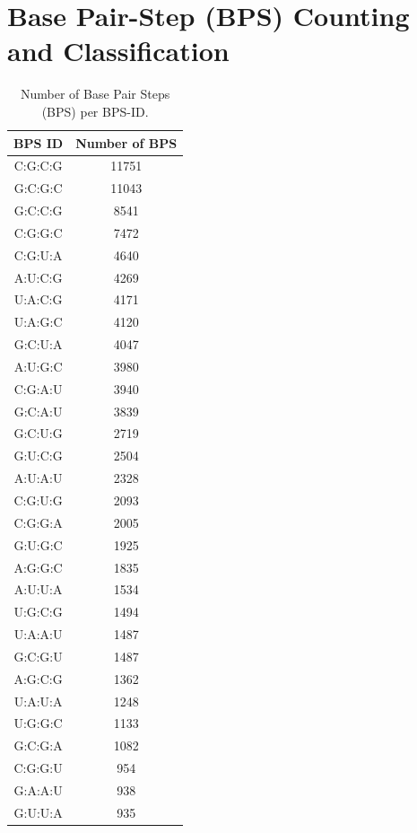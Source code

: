 




\section{Base Pair-Step (BPS) Counting and Classification}


\begin{center}
\begin{longtable}{c|c}
\caption{Number of Base Pair Steps (BPS) per BPS-ID.}\\ \hline
\bf{BPS ID} & \bf{Number of BPS}\\ \hline \hline
C:G:C:G & 11751 \\ \hline
G:C:G:C & 11043 \\ \hline
G:C:C:G & 8541 \\ \hline
C:G:G:C & 7472 \\ \hline
C:G:U:A & 4640 \\ \hline
A:U:C:G & 4269 \\ \hline
U:A:C:G & 4171 \\ \hline
U:A:G:C & 4120 \\ \hline
G:C:U:A & 4047 \\ \hline
A:U:G:C & 3980 \\ \hline
C:G:A:U & 3940 \\ \hline
G:C:A:U & 3839 \\ \hline
G:C:U:G & 2719 \\ \hline
G:U:C:G & 2504 \\ \hline
A:U:A:U & 2328 \\ \hline
C:G:U:G & 2093 \\ \hline
C:G:G:A & 2005 \\ \hline
G:U:G:C & 1925 \\ \hline
A:G:G:C & 1835 \\ \hline
A:U:U:A & 1534 \\ \hline
U:G:C:G & 1494 \\ \hline
U:A:A:U & 1487 \\ \hline
G:C:G:U & 1487 \\ \hline
A:G:C:G & 1362 \\ \hline
U:A:U:A & 1248 \\ \hline
U:G:G:C & 1133 \\ \hline
G:C:G:A & 1082 \\ \hline
C:G:G:U & 954 \\ \hline
G:A:A:U & 938 \\ \hline
G:U:U:A & 935 \\ \hline

\end{longtable}
\end{center}

